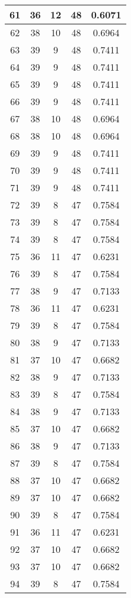 \documentclass[letterpaper, 12pt]{article}
\begin{document}
\begin{longtable}{|c|c|c|c|c|}
\hline
61 & 36 & 12 & 48 & 0.6071 \\
\hline
62 & 38 & 10 & 48 & 0.6964 \\
\hline
63 & 39 & 9 & 48 & 0.7411 \\
\hline
64 & 39 & 9 & 48 & 0.7411 \\
\hline
65 & 39 & 9 & 48 & 0.7411 \\
\hline
66 & 39 & 9 & 48 & 0.7411 \\
\hline
67 & 38 & 10 & 48 & 0.6964 \\
\hline
68 & 38 & 10 & 48 & 0.6964 \\
\hline
69 & 39 & 9 & 48 & 0.7411 \\
\hline
70 & 39 & 9 & 48 & 0.7411 \\
\hline
71 & 39 & 9 & 48 & 0.7411 \\
\hline
72 & 39 & 8 & 47 & 0.7584 \\
\hline
73 & 39 & 8 & 47 & 0.7584 \\
\hline
74 & 39 & 8 & 47 & 0.7584 \\
\hline
75 & 36 & 11 & 47 & 0.6231 \\
\hline
76 & 39 & 8 & 47 & 0.7584 \\
\hline
77 & 38 & 9 & 47 & 0.7133 \\
\hline
78 & 36 & 11 & 47 & 0.6231 \\
\hline
79 & 39 & 8 & 47 & 0.7584 \\
\hline
80 & 38 & 9 & 47 & 0.7133 \\
\hline
81 & 37 & 10 & 47 & 0.6682 \\
\hline
82 & 38 & 9 & 47 & 0.7133 \\
\hline
83 & 39 & 8 & 47 & 0.7584 \\
\hline
84 & 38 & 9 & 47 & 0.7133 \\
\hline
85 & 37 & 10 & 47 & 0.6682 \\
\hline
86 & 38 & 9 & 47 & 0.7133 \\
\hline
87 & 39 & 8 & 47 & 0.7584 \\
\hline
88 & 37 & 10 & 47 & 0.6682 \\
\hline
89 & 37 & 10 & 47 & 0.6682 \\
\hline
90 & 39 & 8 & 47 & 0.7584 \\
\hline
91 & 36 & 11 & 47 & 0.6231 \\
\hline
92 & 37 & 10 & 47 & 0.6682 \\
\hline
93 & 37 & 10 & 47 & 0.6682 \\
\hline
94 & 39 & 8 & 47 & 0.7584 \\
\hline

\end{longtable}
\end{document}
